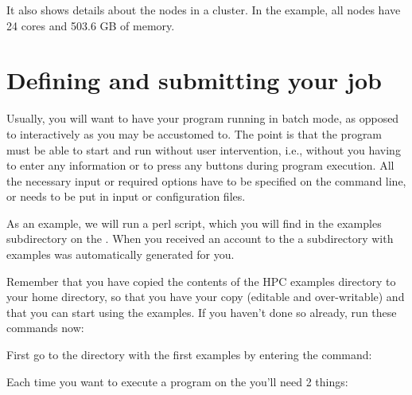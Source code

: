 It also shows details about the nodes in a cluster. In the example, all nodes have
24 cores and 503.6 GB of memory.

\fi

\section{Defining and submitting your job}
\hypertarget{sec:defining-and-submitting-job}{}

Usually, you will want to have your program running in batch mode, as opposed
to interactively as you may be accustomed to. The point is that the program
must be able to start and run without user intervention, i.e., without you
having to enter any information or to press any buttons during program
execution. All the necessary input or required options have to be specified on
the command line, or needs to be put in input or configuration files.

As an example, we will run a perl script, which you will find in the examples
subdirectory on the \hpc. When you received an account to the \hpc a
subdirectory with examples was automatically generated for you.

Remember that you have copied the contents of the HPC examples directory to
your home directory, so that you have your  copy (editable
and over-writable) and that you can start using the examples. If you haven't
done so already, run these commands now:

\begin{prompt}
\end{prompt}

First go to the directory with the first examples by entering the command:

\begin{prompt}
\end{prompt}

Each time you want to execute a program on the \hpc you'll need 2 things:

